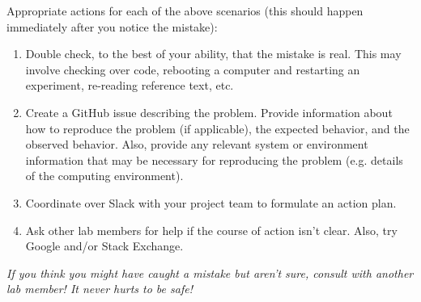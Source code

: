 \documentclass{tufte-book} %
\begin{document}
Appropriate actions for each of the above scenarios (this should
happen immediately after you notice the mistake):
\begin{enumerate}
\item Double check, to the best of your ability, that the mistake is
  real.  This may involve checking over code, rebooting a computer and
  restarting an experiment, re-reading reference text, etc.
\item Create a GitHub issue describing the problem.  Provide
  information about how to reproduce the problem (if applicable), the
  expected behavior, and the observed behavior.  Also, provide any
  relevant system or environment information that may be necessary for
  reproducing the problem (e.g. details of the computing environment).
\item Coordinate over Slack with your project team to formulate an
  action plan.
\item Ask other lab members for help if the course of action isn't
  clear.  Also, try Google and/or Stack Exchange.
\end{enumerate}

\noindent \textit{If you think you might have caught a mistake but aren't
  sure, consult with another lab member! It never hurts to be safe!}



\end{document}
